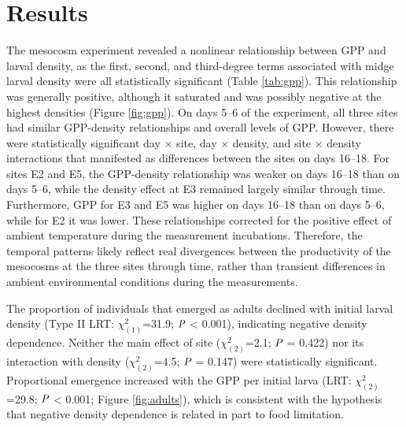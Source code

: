 

\section*{Results}

The mesocosm experiment revealed a nonlinear relationship between GPP and larval density,
as the first, second, and third-degree terms associated with midge larval density 
were all statistically significant (Table \ref{tab:gpp}). 
This relationship was generally positive, 
although it saturated 
and was possibly negative at the highest densities (Figure \ref{fig:gpp}).
On days 5--6 of the experiment, 
all three sites had similar GPP-density relationships and overall levels of GPP.
However, there were statistically significant day $\times$ site, day $\times$ density,
and site $\times$ density interactions that manifested as differences
between the sites on days 16--18.
For sites E2 and E5, the GPP-density relationship was weaker 
on days 16--18 than on days 5--6, 
while the density effect at E3 remained largely similar through time.
Furthermore, GPP for E3 and E5 was higher on days 16--18 than on days 5--6, 
while for E2 it was lower.
These relationships corrected for the positive effect 
of ambient temperature during the measurement incubations.
Therefore, the temporal patterns likely reflect real divergences 
between the productivity of the mesocosms at the three sites through time, 
rather than transient differences in ambient environmental conditions 
during the measurements.

The proportion of individuals that emerged as adults declined with initial larval density 
(Type II LRT: $\chi^2_{(1)}$=31.9; $\emph{P}$ < 0.001), 
indicating negative density dependence.
Neither the main effect of site
($\chi^2_{(2)}$=2.1; $\emph{P}$ = 0.422)
nor its interaction with density 
($\chi^2_{(2)}$=4.5; $\emph{P}$ = 0.147) were statistically significant.
Proportional emergence increased with the GPP per initial larva 
(LRT: $\chi^2_{(2)}$=29.8; $\emph{P}$ < 0.001; Figure \ref{fig:adults}),
which is consistent with the hypothesis that negative density dependence is 
related in part to food limitation.

